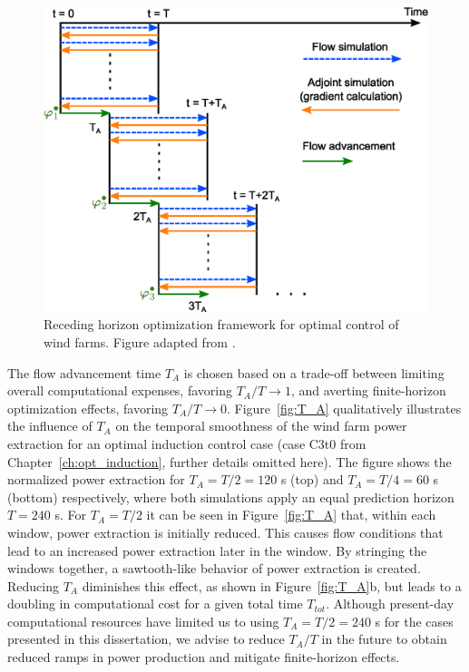 \begin{figure}[]
	\centering
	\includegraphics[width=0.65\linewidth]{chapters/optimal_control_problem/figure2_bw.eps}
	\caption[Receding horizon optimization framework for optimal control of wind farms.]{Receding horizon optimization framework for optimal control of wind farms. Figure adapted from \cite{goit2015optimal}.}
	\label{fig:drawing_receding_horizon}
\end{figure}

The flow advancement time $T_A$ is chosen based on a trade-off between limiting overall computational expenses, favoring $T_A/T \rightarrow 1$, and averting finite-horizon optimization effects, favoring $T_A/T \rightarrow 0$. Figure~\ref{fig:T_A} qualitatively illustrates the influence of $T_A$ on the temporal smoothness of the wind farm power extraction for an optimal induction control case (case C3t0 from Chapter~\ref{ch:opt_induction}, further details omitted here). The figure shows the normalized power extraction for $T_A = T/2 = 120$ s (top) and $T_A = T/4 = 60$ s (bottom) respectively, where both simulations apply an equal prediction horizon $T = 240$ s. For $T_A = T/2$ it can be seen in Figure~\ref{fig:T_A} that, within each window, power extraction is initially reduced. This causes flow conditions that lead to an increased power extraction later in the window. By stringing the windows together, a sawtooth-like behavior of power extraction is created. Reducing $T_A$ diminishes this effect, as shown in Figure~\ref{fig:T_A}b, but leads to a doubling in computational cost for a given total time $T_{tot}$. Although present-day computational resources have limited us to using $T_A = T/2 = 240$ s for the cases presented in this dissertation, we advise to reduce $T_A/T$ in the future to obtain reduced ramps in power production and mitigate finite-horizon effects.

